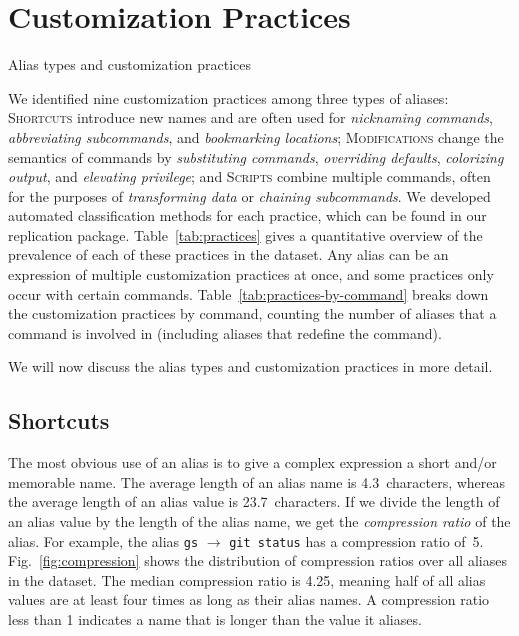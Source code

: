 \documentclass[sigconf,nonacm,screen]{acmart}
\newcommand{\alias}[2]{{\texttt{#1} $\rightarrow$ \texttt{#2}}}
\begin{document}
\section{Customization Practices}

\begin{table}
    \centering
	\caption{Alias types and customization practices}
    \label{tab:practices}
    
\end{table}

We identified nine customization practices among three types of aliases:
\textsc{Shortcuts} introduce new names and are often used for \emph{nicknaming commands}, \emph{abbreviating subcommands}, and \emph{bookmarking locations};
\textsc{Modifications} change the semantics of commands by \emph{substituting commands}, \emph{overriding defaults}, \emph{colorizing output}, and \emph{elevating privilege};
and \textsc{Scripts} combine multiple commands, often for the purposes of \emph{transforming data} or \emph{chaining subcommands}.
We developed automated classification methods for each practice, which can be found in our replication package.
Table~\ref{tab:practices} gives a quantitative overview of the prevalence of each of these practices in the dataset.
Any alias can be an expression of multiple customization practices at once, and some practices only occur with certain commands.
Table~\ref{tab:practices-by-command} breaks down the customization practices by command, counting the number of aliases that a command is involved in (including aliases that redefine the command).

We will now discuss the alias types and customization practices in more detail.



\subsection{Shortcuts}

The most obvious use of an alias is to give a complex expression a short and/or memorable name.
The average length of an alias name is 4.3~characters, whereas the average length of an alias value is 23.7~characters.
If we divide the length of an alias value by the length of the alias name, we get the \emph{compression ratio} of the alias.
For example, the alias \alias{gs}{git status} has a compression ratio of~5.
Fig.~\ref{fig:compression} shows the distribution of compression ratios over all aliases in the dataset.
The median compression ratio is 4.25, meaning half of all alias values are at least four times as long as their alias names.
A compression ratio less than 1 indicates a name that is longer than the value it aliases.
\end{document}
